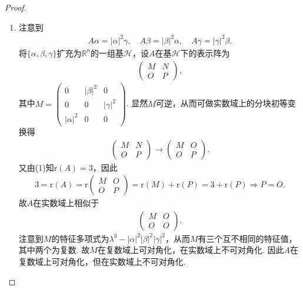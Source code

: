\documentclass[../../main.tex]{subfiles}%
\begin{document}
\begin{proof}
\begin{enumerate}[(1)]
\item 注意到
\begin{align*}
A\alpha=|\alpha|^2\gamma,\quad A\beta=|\beta|^2\alpha,\quad A\gamma=|\gamma|^2\beta.
\end{align*}
将$\{\alpha,\beta,\gamma\}$扩充为$\mathbb{R}^n$的一组基$\mathscr{H}$，设$A$在基$\mathscr{H}$下的表示阵为
\begin{align*}
\begin{pmatrix}
M&N\\
O& P
\end{pmatrix},
\end{align*}
其中$M=\begin{pmatrix}
0&|\beta|^2&0\\
0&0&|\gamma|^2\\
|\alpha|^2&0&0
\end{pmatrix}$.
显然$M$可逆，从而可做实数域上的分块初等变换得
\begin{align*}
\begin{pmatrix}
M&N\\
O& P
\end{pmatrix}\rightarrow \begin{pmatrix}
M&O\\
O& P
\end{pmatrix}.
\end{align*}
又由(1)知$\text{r}(A)=3$，因此
\begin{align*}
3=\text{r}(A)=\text{r}\begin{pmatrix}
M&O\\
O& P
\end{pmatrix}=\text{r}(M)+\text{r}(P)=3+\text{r}(P)\Longrightarrow P=O.
\end{align*}
故$A$在实数域上相似于
\begin{align*}
\begin{pmatrix}
M&O\\
O&O
\end{pmatrix}.
\end{align*}
注意到$M$的特征多项式为$\lambda^3-|\alpha|^2|\beta|^2|\gamma|^2$，从而$M$有三个互不相同的特征值，其中两个为复数. 故$M$在复数域上可对角化，在实数域上不可对角化. 因此$A$在复数域上可对角化，但在实数域上不可对角化.
\end{enumerate}

\end{proof}
\end{document}
